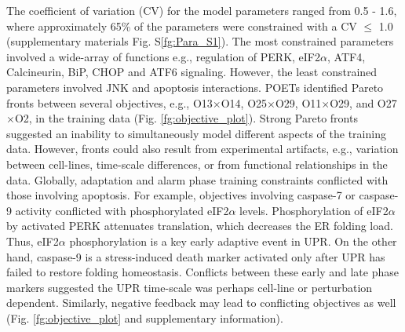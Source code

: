 \documentclass[fleqn,10pt]{wlscirep}
\begin{document}
The coefficient of variation (CV) for the model parameters ranged from 0.5 - 1.6, where approximately 65\% of the parameters were constrained with a CV $\leq$ 1.0 (supplementary materials Fig. S\ref{fg:Para_S1}). 
The most constrained parameters involved a wide-array of functions e.g., regulation of PERK, eIF2$\alpha$, ATF4, Calcineurin, BiP, CHOP and ATF6 signaling. However, the least constrained parameters involved JNK and apoptosis interactions.
POETs identified Pareto fronts between several objectives, e.g., O13$\times$O14, O25$\times$O29, O11$\times$O29, and O27$\times$O2, in the training data  (Fig. \ref{fg:objective_plot}). Strong Pareto fronts suggested an inability to simultaneously model different aspects of the training data. However, fronts could also result from experimental artifacts, e.g., variation between cell-lines, time-scale differences, or from functional relationships in the data. Globally, adaptation and alarm phase training constraints conflicted with those involving apoptosis. For example, objectives involving caspase-7 or caspase-9 activity conflicted with phosphorylated eIF2$\alpha$ levels. Phosphorylation of eIF2$\alpha$ by activated PERK attenuates translation, which decreases the ER folding load. Thus, eIF2$\alpha$ phosphorylation is a key early adaptive event in UPR. On the other hand, caspase-9 is a stress-induced death marker activated only after UPR has failed to restore folding homeostasis. Conflicts between these early and late phase markers suggested the UPR time-scale was perhaps cell-line or perturbation dependent. Similarly, negative feedback may lead to conflicting objectives as well (Fig. \ref{fg:objective_plot} and supplementary information).
\end{document}
